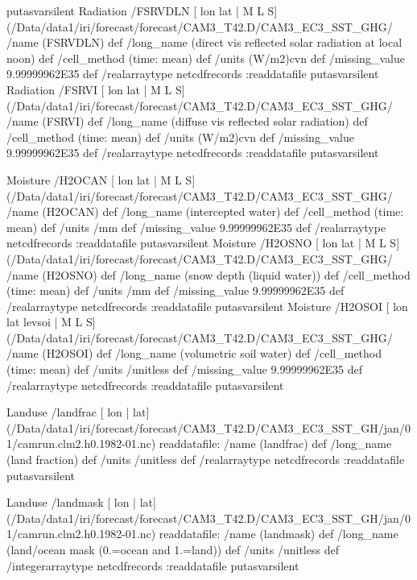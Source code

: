 \begin{ingrid}
{}putasvarsilent
Radiation /FSRVDLN{
[ lon lat | M L S] (/Data/data1/iri/forecast/forecast/CAM3_T42.D/CAM3_EC3_SST_GHG/%
/name (FSRVDLN) def
 /long_name (direct vis reflected solar radiation at local noon) def
 /cell_method (time: mean) def
 /units (W/m2)cvn def
 /missing_value 9.99999962E35 def
 /realarraytype netcdfrecords :readdatafile
}putasvarsilent
Radiation /FSRVI{
[ lon lat | M L S] (/Data/data1/iri/forecast/forecast/CAM3_T42.D/CAM3_EC3_SST_GHG/%
/name (FSRVI) def
 /long_name (diffuse vis reflected solar radiation) def
 /cell_method (time: mean) def
 /units (W/m2)cvn def
 /missing_value 9.99999962E35 def
 /realarraytype netcdfrecords :readdatafile
}putasvarsilent

Moisture /H2OCAN{
[ lon lat | M L S] (/Data/data1/iri/forecast/forecast/CAM3_T42.D/CAM3_EC3_SST_GHG/%
/name (H2OCAN) def
 /long_name (intercepted water) def
 /cell_method (time: mean) def
 /units /mm def
 /missing_value 9.99999962E35 def
 /realarraytype netcdfrecords :readdatafile
}putasvarsilent
Moisture /H2OSNO{
[ lon lat | M L S] (/Data/data1/iri/forecast/forecast/CAM3_T42.D/CAM3_EC3_SST_GHG/%
/name (H2OSNO) def
 /long_name (snow depth (liquid water)) def
 /cell_method (time: mean) def
 /units /mm def
 /missing_value 9.99999962E35 def
 /realarraytype netcdfrecords :readdatafile
}putasvarsilent
Moisture /H2OSOI{
[ lon lat levsoi | M L S] (/Data/data1/iri/forecast/forecast/CAM3_T42.D/CAM3_EC3_SST_GHG/%
/name (H2OSOI) def
 /long_name (volumetric soil water) def
 /cell_method (time: mean) def
 /units /unitless def
 /missing_value 9.99999962E35 def
 /realarraytype netcdfrecords :readdatafile
}putasvarsilent

Landuse /landfrac{
[ lon | lat] (/Data/data1/iri/forecast/forecast/CAM3_T42.D/CAM3_EC3_SST_GH/jan/01/camrun.clm2.h0.1982-01.nc) readdatafile:
/name (landfrac) def
 /long_name (land fraction) def
 /units /unitless def
 /realarraytype netcdfrecords :readdatafile
}putasvarsilent

Landuse /landmask{
[ lon | lat] (/Data/data1/iri/forecast/forecast/CAM3_T42.D/CAM3_EC3_SST_GH/jan/01/camrun.clm2.h0.1982-01.nc) readdatafile:
/name (landmask) def
 /long_name (land/ocean mask (0.=ocean and 1.=land)) def
 /units /unitless def
 /integerarraytype netcdfrecords :readdatafile
}putasvarsilent


\end{ingrid}
